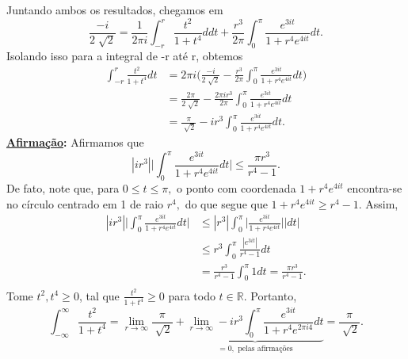 \documentclass[ComplexAnalysis/complex.tex]{subfiles}
\begin{document}
\begin{exer*}
	Juntando ambos os resultados, chegamos em
	\[
		\frac{-i}{2\sqrt[]{2}} = \frac{1}{2\pi i}\int_{-r}^{r}\frac{t^{2}}{1+t^{4}}ddt + \frac{r^{3}}{2\pi }\int_{0}^{\pi }\frac{e^{3it}}{1 + r^{4}e^{4it}}dt.
	\]
	Isolando isso para a integral de -r até r, obtemos
	\begin{align*}
		\int_{-r}^{r}\frac{t^{2}}{1+t^{4}}dt & = 2\pi i \biggl(\frac{-i}{2\sqrt[]{2}} - \frac{r^{3}}{2\pi }\int_{0}^{\pi }\frac{e^{3it}}{1 + r^{4}e^{4it}}dt\biggr) \\
		                                     & = \frac{2\pi }{2\sqrt[]{2}} - \frac{2\pi ir^{3}}{2\pi }\int_{0}^{\pi }\frac{e^{3it}}{1 + r^{4}e^{4it}}dt             \\
		                                     & = \frac{\pi }{\sqrt[]{2}} - ir^{3}\int_{0}^{\pi }\frac{e^{3it}}{1+r^{4}e^{4it}}dt.
	\end{align*}
	\textbf{\underline{Afirmação}:} Afirmamos que
	\[
		|ir^{3}|\biggl\vert \int_{0}^{\pi }\frac{e^{3it}}{1+ r^{4}e^{4it}}dt \biggr\vert \leq \frac{\pi r^{3}}{r^{4}-1}.
	\]
	De fato, note que, para \(0\leq t\leq \pi ,\) o ponto com coordenada \(1 + r^{4}e^{4it}\) encontra-se no círculo centrado em 1 de raio \(r^{4},\) do que
	segue que \(1 + r^{4}e^{4it} \geq r^{4}-1.\) Assim,
	\begin{align*}
		|ir^{3}|\biggl\vert \int_{0}^{\pi }\frac{e^{3it}}{1+r^{4}e^{4it}}dt \biggr\vert & \leq |r^{3}|\int_{0}^{\pi }\biggl\vert \frac{e^{3it}}{1+r^{4}e^{4it}} \biggr\vert|dt| \\
		                                                                                & \leq r^{3}\int_{0}^{\pi }\frac{|e^{3it}|}{r^{4}-1}dt                                  \\
		                                                                                & = \frac{r^{3}}{r^{4}-1}\int_{0}^{\pi }1dt = \frac{\pi r^{3}}{r^{4} - 1}.              \\
	\end{align*}
	Tome \(t^{2}, t^{4}\geq 0\), tal que \(\frac{t^{2}}{1 + t^{4}} \geq 0\) para todo \(t\in \mathbb{R}.\) Portanto,
	\[
		\int_{-\infty}^{\infty}\frac{t^{2}}{1+t^{4}}=\lim_{r\to \infty}\frac{\pi }{\sqrt[]{2}} + \underbrace{\lim_{r\to \infty}-ir^{3}\int_{0}^{\pi }\frac{e^{3it}}{1 + r^{4}e^{2\pi i4}}dt}_{= 0, \text{ pelas afirmações}} = \frac{\pi }{\sqrt[]{2}}.
	\]
\end{exer*}
\end{document}
